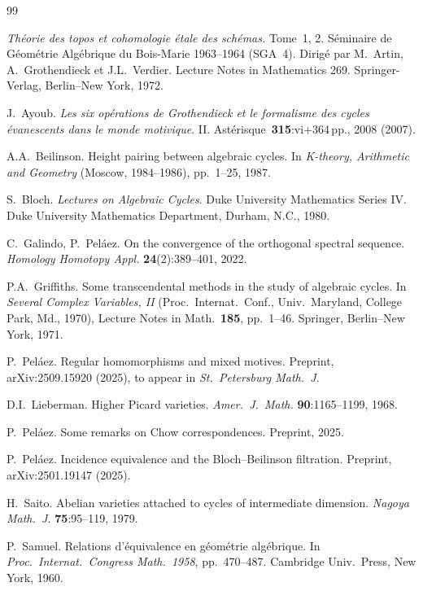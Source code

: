 \documentclass[12pt,a4paper]{article}
\theoremstyle{definition}
\begin{document}
\begin{thebibliography}{99}

\textit{Théorie des topos et cohomologie étale des schémas.}
Tome~1, 2. Séminaire de Géométrie Algébrique du Bois-Marie 1963--1964 (SGA~4).
Dirigé par M.\ Artin, A.\ Grothendieck et J.L.\ Verdier. Lecture Notes in Mathematics
269. Springer-Verlag, Berlin--New York, 1972.

J.\ Ayoub. \textit{Les six opérations de Grothendieck et le formalisme des cycles
évanescents dans le monde motivique}. II. Astérisque~\textbf{315}:vi+364\,pp.,
2008 (2007).

A.A.\ Beilinson. Height pairing between algebraic cycles. In
\textit{K-theory, Arithmetic and Geometry} (Moscow, 1984--1986), pp.\ 1--25, 1987.

S.\ Bloch. \textit{Lectures on Algebraic Cycles}. Duke University Mathematics Series
IV. Duke University Mathematics Department, Durham, N.C., 1980.

C.\ Galindo, P.\ Peláez. On the convergence of the orthogonal spectral sequence.
\textit{Homology Homotopy Appl.} \textbf{24}(2):389--401, 2022.

P.A.\ Griffiths. Some transcendental methods in the study of algebraic cycles.
In \textit{Several Complex Variables, II} (Proc.\ Internat.\ Conf., Univ.\
Maryland, College Park, Md., 1970), Lecture Notes in Math.\ \textbf{185},
pp.\ 1--46. Springer, Berlin--New York, 1971.

P.\ Peláez. Regular homomorphisms and mixed motives.
Preprint, arXiv:2509.15920 (2025), to appear in \textit{St.\ Petersburg Math.\
J.}

D.I.\ Lieberman. Higher Picard varieties. \textit{Amer.\ J.\ Math.}
\textbf{90}:1165--1199, 1968.

P.\ Peláez. Some remarks on Chow correspondences. Preprint, 2025.

\bibitem{PelRey25}
P.\ Peláez. Incidence equivalence and the Bloch--Beilinson
filtration. Preprint, arXiv:2501.19147 (2025).

H.\ Saito. Abelian varieties attached to cycles of intermediate dimension.
\textit{Nagoya Math.\ J.} \textbf{75}:95--119, 1979.

P.\ Samuel. Relations d'équivalence en géométrie algébrique. In
\textit{Proc.\ Internat.\ Congress Math.\ 1958}, pp.\ 470--487.
Cambridge Univ.\ Press, New York, 1960.


\end{thebibliography}
\end{document}
